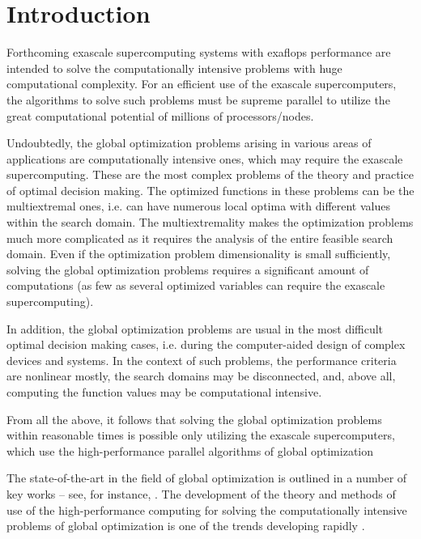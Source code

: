 \documentclass[
11pt,%
tightenlines,%
twoside,%
onecolumn,%
nofloats,%
nobibnotes,%
nofootinbib,%
superscriptaddress,%
noshowpacs,%
centertags]%
{revtex4}
\begin{document}
\section{Introduction}

Forthcoming exascale supercomputing systems with exaflops performance are intended to solve the computationally intensive problems with huge computational complexity. For an efficient use of the exascale supercomputers, the algorithms to solve such problems must be supreme parallel to utilize the great computational potential of millions of processors/nodes.

Undoubtedly, the global optimization problems arising in various areas of applications are computationally intensive ones, which may require the exascale supercomputing. These are the most complex problems of the theory and practice of optimal decision making. The optimized functions in these problems can be the multiextremal ones, i.e. can have numerous local optima with different values within the search domain. The multiextremality makes the optimization problems much more complicated as it requires the analysis of the entire feasible search domain. Even if the optimization problem dimensionality is small sufficiently, solving the global optimization problems requires a significant amount of computations (as few as several optimized variables can require the exascale supercomputing).

In addition, the global optimization problems are usual in the most difficult optimal decision making cases, i.e. during the computer-aided design of complex devices and systems. In the context of such problems, the performance criteria are nonlinear mostly, the search domains may be disconnected, and, above all, computing the function values may be computational intensive.

From all the above, it follows that solving the global optimization problems within reasonable times is possible only utilizing the exascale supercomputers, which use the high-performance parallel algorithms of global optimization

The state-of-the-art in the field of global optimization is outlined in a number of key works -- see, for instance, \cite{Floudas, Locatelli, Strongin1, Pardalos, Sergeyev1, Paulavicius}. The development of the theory and methods of use of the high-performance computing for solving the computationally intensive problems of global optimization is one of the trends developing rapidly \cite{Strongin1, Ciegis, Luque, Strongin2}.
\end{document}
